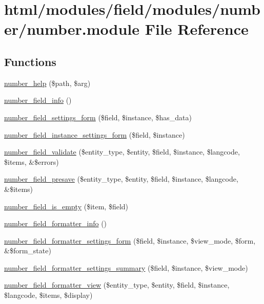 \hypertarget{number_8module}{
\section{html/modules/field/modules/number/number.module File Reference}
\label{number_8module}
}
\subsection*{Functions}
\begin{DoxyCompactItemize}
\item 
\hyperlink{number_8module_abd9b7b4ee0cd5563585099722a3a625b}{number\_\-help} (\$path, \$arg)
\item 
\hyperlink{number_8module_a5fbb6714145eaaa5efde9359d032bd50}{number\_\-field\_\-info} ()
\item 
\hyperlink{number_8module_aad816feb169b3cdfa058359dd47a7cc7}{number\_\-field\_\-settings\_\-form} (\$field, \$instance, \$has\_\-data)
\item 
\hyperlink{number_8module_ad0d09477b1f2d0a143491ef5739d4b13}{number\_\-field\_\-instance\_\-settings\_\-form} (\$field, \$instance)
\item 
\hyperlink{number_8module_a6d65c96588f80687db59b498ed16c686}{number\_\-field\_\-validate} (\$entity\_\-type, \$entity, \$field, \$instance, \$langcode, \$items, \&\$errors)
\item 
\hyperlink{number_8module_a0574f4c4143a2ce871f28e348cde0683}{number\_\-field\_\-presave} (\$entity\_\-type, \$entity, \$field, \$instance, \$langcode, \&\$items)
\item 
\hyperlink{number_8module_a111e78cb87246af587a6266b3c001f0b}{number\_\-field\_\-is\_\-empty} (\$item, \$field)
\item 
\hyperlink{number_8module_ac49646c88cebb39a1eba98873252366a}{number\_\-field\_\-formatter\_\-info} ()
\item 
\hyperlink{number_8module_a2c5abe58ae0410b69e57ad89719b82e4}{number\_\-field\_\-formatter\_\-settings\_\-form} (\$field, \$instance, \$view\_\-mode, \$form, \&\$form\_\-state)
\item 
\hyperlink{number_8module_afe760de9ebf67e8e5f715ff7da247c32}{number\_\-field\_\-formatter\_\-settings\_\-summary} (\$field, \$instance, \$view\_\-mode)
\item 
\hyperlink{number_8module_a5146f1692cf2227d54c62325a4ed7241}{number\_\-field\_\-formatter\_\-view} (\$entity\_\-type, \$entity, \$field, \$instance, \$langcode, \$items, \$display)

\end{DoxyCompactItemize}
